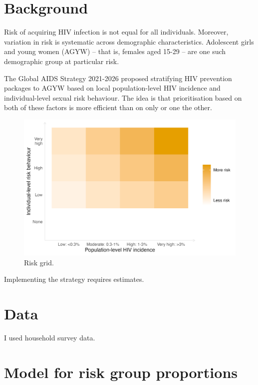 \documentclass[a4paper, nobind]{templates/ociamthesis}
\begin{document}
\hypertarget{background-2}{%
\section{Background}\label{background-2}}

Risk of acquiring HIV infection is not equal for all individuals.
Moreover, variation in risk is systematic across demographic characteristics.
Adolescent girls and young women (AGYW) -- that is, females aged 15-29 -- are one such demographic group at particular risk.

The Global AIDS Strategy 2021-2026 proposed stratifying HIV prevention packages to AGYW based on local population-level HIV incidence and individual-level sexual risk behaviour.
The idea is that prioritisation based on both of these factors is more efficient than on only or one the other.

\begin{figure}

{\centering \includegraphics[width=0.95\linewidth]{figures/extra/risk-grid} 

}

\caption{Risk grid.}\label{fig:risk-grid}
\end{figure}

Implementing the strategy requires estimates.

\hypertarget{data}{%
\section{Data}\label{data}}

I used household survey data.

\hypertarget{model-for-risk-group-proportions}{%
\section{Model for risk group proportions}\label{model-for-risk-group-proportions}}
\end{document}
